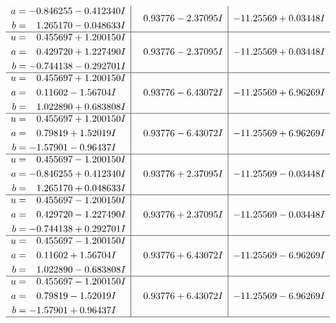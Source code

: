 \documentclass[1p]{elsarticle_modified}
\theoremstyle{definition}
\begin{document}
$$\begin{array}{c|c|c}
\begin{aligned}
a &= -0.846255 - 0.412340 I \\
b &= \phantom{-}1.265170 - 0.048633 I\end{aligned}
 & \phantom{-}0.93776 - 2.37095 I & -11.25569 + 0.03448 I \\ \hline\begin{aligned}
u &= \phantom{-}0.455697 + 1.200150 I \\
a &= \phantom{-}0.429720 + 1.227490 I \\
b &= -0.744138 - 0.292701 I\end{aligned}
 & \phantom{-}0.93776 - 2.37095 I & -11.25569 + 0.03448 I \\ \hline\begin{aligned}
u &= \phantom{-}0.455697 + 1.200150 I \\
a &= \phantom{-}0.11602 - 1.56704 I \\
b &= \phantom{-}1.022890 + 0.683808 I\end{aligned}
 & \phantom{-}0.93776 - 6.43072 I & -11.25569 + 6.96269 I \\ \hline\begin{aligned}
u &= \phantom{-}0.455697 + 1.200150 I \\
a &= \phantom{-}0.79819 + 1.52019 I \\
b &= -1.57901 - 0.96437 I\end{aligned}
 & \phantom{-}0.93776 - 6.43072 I & -11.25569 + 6.96269 I \\ \hline\begin{aligned}
u &= \phantom{-}0.455697 - 1.200150 I \\
a &= -0.846255 + 0.412340 I \\
b &= \phantom{-}1.265170 + 0.048633 I\end{aligned}
 & \phantom{-}0.93776 + 2.37095 I & -11.25569 - 0.03448 I \\ \hline\begin{aligned}
u &= \phantom{-}0.455697 - 1.200150 I \\
a &= \phantom{-}0.429720 - 1.227490 I \\
b &= -0.744138 + 0.292701 I\end{aligned}
 & \phantom{-}0.93776 + 2.37095 I & -11.25569 - 0.03448 I \\ \hline\begin{aligned}
u &= \phantom{-}0.455697 - 1.200150 I \\
a &= \phantom{-}0.11602 + 1.56704 I \\
b &= \phantom{-}1.022890 - 0.683808 I\end{aligned}
 & \phantom{-}0.93776 + 6.43072 I & -11.25569 - 6.96269 I \\ \hline\begin{aligned}
u &= \phantom{-}0.455697 - 1.200150 I \\
a &= \phantom{-}0.79819 - 1.52019 I \\
b &= -1.57901 + 0.96437 I\end{aligned}
 & \phantom{-}0.93776 + 6.43072 I & -11.25569 - 6.96269 I\\
 \hline 
 \end{array}$$\newpage\newpage\renewcommand{\arraystretch}{1}
\end{document}

